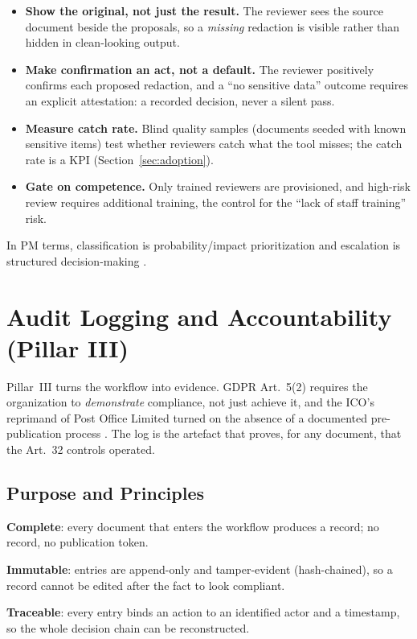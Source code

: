 \documentclass[12pt,a4paper]{article}
\begin{document}
\begin{itemize}
  \item \textbf{Show the original, not just the result.} The reviewer sees the source document beside the proposals, so a \emph{missing} redaction is visible rather than hidden in clean-looking output.
  \item \textbf{Make confirmation an act, not a default.} The reviewer positively confirms each proposed redaction, and a ``no sensitive data'' outcome requires an explicit attestation: a recorded decision, never a silent pass.
  \item \textbf{Measure catch rate.} Blind quality samples (documents seeded with known sensitive items) test whether reviewers catch what the tool misses; the catch rate is a KPI (Section~\ref{sec:adoption}).
  \item \textbf{Gate on competence.} Only trained reviewers are provisioned, and high-risk review requires additional training, the control for the ``lack of staff training'' risk.
\end{itemize}

In PM terms, classification is probability/impact prioritization and escalation is structured decision-making \cite{falchi_slides}.

\section{Audit Logging and Accountability (Pillar III)}
\label{sec:audit}

Pillar~III turns the workflow into evidence. GDPR Art.~5(2) requires the organization to \emph{demonstrate} compliance, not just achieve it, and the ICO's reprimand of Post Office Limited turned on the absence of a documented pre-publication process \cite{ico2025}. The log is the artefact that proves, for any document, that the Art.~32 controls operated.

\subsection{Purpose and Principles}

\begin{principlebox}
\textbf{Complete}: every document that enters the workflow produces a record; no record, no publication token.\par
\textbf{Immutable}: entries are append-only and tamper-evident (hash-chained), so a record cannot be edited after the fact to look compliant.\par
\textbf{Traceable}: every entry binds an action to an identified actor and a timestamp, so the whole decision chain can be reconstructed.
\end{principlebox}
\end{document}
